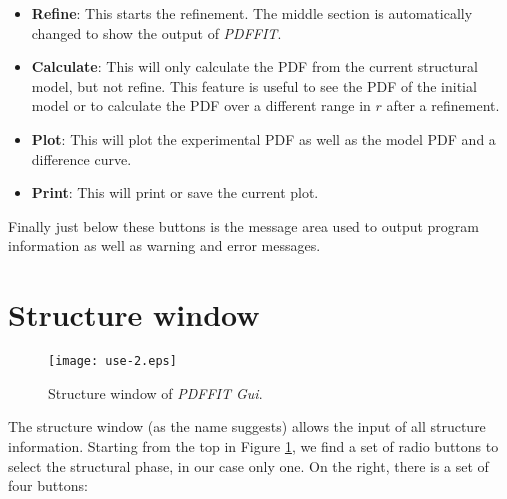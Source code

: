 \begin{itemize}
  \item \textbf{Refine}: This starts the refinement. The middle
  section is automatically changed to show the output of {\it
  PDFFIT}.

  \item \textbf{Calculate}: This will only calculate the PDF from
  the current structural model, but not refine. This feature is
  useful to see the PDF of the initial model or to calculate the PDF
  over a different range in $r$ after a refinement.

  \item \textbf{Plot}: This will plot the experimental PDF as well
  as the model PDF and a difference curve.

  \item \textbf{Print}: This will print or save the current plot.
\end{itemize}

\noindent Finally just below these buttons is the message area used
to output program information as well as warning and error messages.

\section{Structure window}

\begin{figure}[!t]
   \centering
   \texttt{[image: use-2.eps]}
   \caption{Structure window of {\it PDFFIT Gui}.}
   \label{fig_use2}
\end{figure}

The structure window (as the name suggests) allows the input of all
structure information. Starting from the top in Figure
\ref{fig_use2}, we find a set of radio buttons to select the
structural phase, in our case only one. On the right, there is a set
of four buttons:

